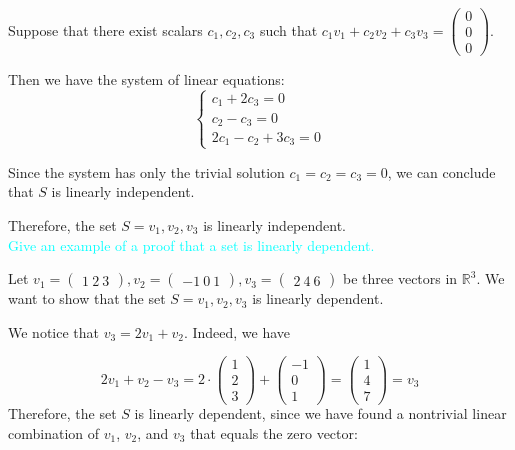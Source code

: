 \documentclass[fontsize=12pt]{scrartcl}
\begin{document}
\noindent
Suppose that there exist scalars $c_1, c_2, c_3$ such that $c_1v_1+c_2v_2+c_3v_3 = \left(\begin{array}{c} 0 \\ 0 \\ 0
\end{array} \right).$

\noindent
Then we have the system of linear equations: $$\left\{ \begin{array}{rcl} c_1 + 2c_3 = 0 \\ c_2 - c_3 = 0 \\ 2c_1 - c_2 + 3c_3 = 0 \end{array} \right.$$

\noindent
Since the system has only the trivial solution $c_1 = c_2 = c_3 = 0$, we can conclude that $S$ is linearly independent.

\noindent
Therefore, the set $S = {v_1, v_2, v_3}$ is linearly independent.\\


\noindent
\textcolor{cyan}{Give an example of a proof that a set is linearly dependent.}

\noindent
Let $v_1 = \begin{pmatrix} 1 \ 2 \ 3 \end{pmatrix}, v_2 = \begin{pmatrix} -1 \ 0 \ 1 \end{pmatrix}, v_3 = \begin{pmatrix} 2 \ 4 \ 6 \end{pmatrix}$ be three vectors in $\mathbb{R}^3$. We want to show that the set $S = {v_1, v_2, v_3}$ is linearly dependent.

\noindent
We notice that $v_3 = 2v_1 + v_2$. Indeed, we have

$$2v_1 + v_2 - v_3 = 2\cdot \left(\begin{array}{c} 1 \\ 2 \\ 3 \end{array} \right) + \left(\begin{array}{c} -1 \\ 0 \\1 \end{array} \right) = \left(\begin{array}{c} 1 \\ 4 \\7 \end{array} \right) = v_3$$
\noindent
Therefore, the set $S$ is linearly dependent, since we have found a nontrivial linear combination of $v_1$, $v_2$, and $v_3$ that equals the zero vector:
\end{document}
